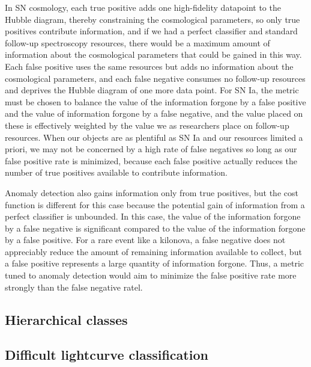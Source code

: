 In SN cosmology, each true positive adds one high-fidelity datapoint to the Hubble diagram, thereby constraining the cosmological parameters, so only true positives contribute information, and if we had a perfect classifier and standard follow-up spectroscopy resources, there would be a maximum amount of information about the cosmological parameters that could be gained in this way.
Each false positive uses the same resources but adds no information about the cosmological parameters, and each false negative consumes no follow-up resources and deprives the Hubble diagram of one more data point.
For SN Ia, the metric must be chosen to balance the value of the information forgone by a false positive and the value of information forgone by a false negative, and the value placed on these is effectively weighted by the value we as researchers place on follow-up resources.
When our objects are as plentiful as SN Ia and our resources limited a priori, we may not be concerned by a high rate of false negatives so long as our false positive rate is minimized, because each false positive actually reduces the number of true positives available to contribute information.

Anomaly detection also gains information only from true positives, but the cost function is different for this case because the potential gain of information from a perfect classifier is unbounded.
In this case, the value of the information forgone by a false negative is significant compared to the value of the information forgone by a false positive.
For a rare event like a kilonova, a false negative does not appreciably reduce the amount of remaining information available to collect, but a false positive represents a large quantity of information forgone.
Thus, a metric tuned to anomaly detection would aim to minimize the false positive rate more strongly than the false negative ratel.

\subsection{Hierarchical classes}
\label{sec:hierarchical}


\subsection{Difficult lightcurve classification}
\label{sec:difficult}

